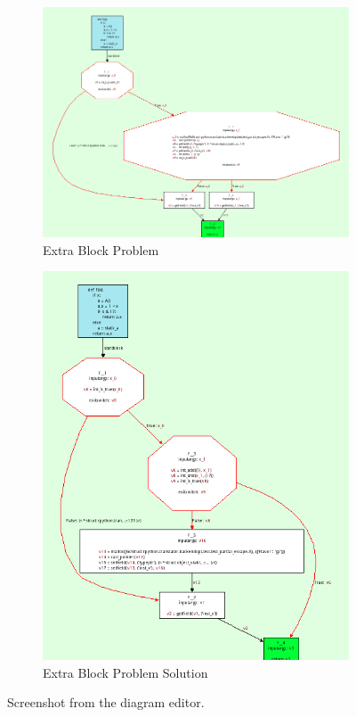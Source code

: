 \begin{figure}[h]
\begin{subfigure}{0.6\textwidth}
\centering
\includegraphics[width=\textwidth]{needs-extra-block-bef.png}
\caption{Extra Block Problem}
\label{figure-8:a}
\end{subfigure}
\begin{subfigure}{0.4\textwidth}
\centering
\includegraphics[width=1.05\textwidth]{needs-extra-block-after.png}
\caption{Extra Block Problem Solution}
\label{figure-8:b}
\end{subfigure}
\caption{Screenshot from the diagram editor.} %
\end{figure}


